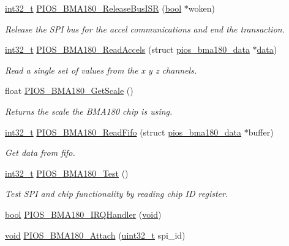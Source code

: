\begin{DoxyCompactItemize}
\hyperlink{group___n_a_m_e_gafd12020da5a235dfcf0c3c748fb5baed}{int32\-\_\-t} \hyperlink{group___p_i_o_s___b_m_a180_gac3df046a46bd9633ccb969436bb8d9ab}{P\-I\-O\-S\-\_\-\-B\-M\-A180\-\_\-\-Release\-Bus\-I\-S\-R} (\hyperlink{group___exported__types_gaf6a258d8f3ee5206d682d799316314b1}{bool} $\ast$woken)
\begin{DoxyCompactList}\small\item\em Release the S\-P\-I bus for the accel communications and end the transaction. \end{DoxyCompactList}\item 
\hyperlink{group___n_a_m_e_gafd12020da5a235dfcf0c3c748fb5baed}{int32\-\_\-t} \hyperlink{group___p_i_o_s___b_m_a180_ga7b56742fa09a8cb81b620c4ddb35e0a0}{P\-I\-O\-S\-\_\-\-B\-M\-A180\-\_\-\-Read\-Accels} (struct \hyperlink{structpios__bma180__data}{pios\-\_\-bma180\-\_\-data} $\ast$\hyperlink{pios__opahrs__proto_8h_a20e3f4bfaeccf09a75ef27e095a10112}{data})
\begin{DoxyCompactList}\small\item\em Read a single set of values from the x y z channels. \end{DoxyCompactList}\item 
float \hyperlink{group___p_i_o_s___b_m_a180_gac0b0ac69b4fecb73c72a5acf917471b4}{P\-I\-O\-S\-\_\-\-B\-M\-A180\-\_\-\-Get\-Scale} ()
\begin{DoxyCompactList}\small\item\em Returns the scale the B\-M\-A180 chip is using. \end{DoxyCompactList}\item 
\hyperlink{group___n_a_m_e_gafd12020da5a235dfcf0c3c748fb5baed}{int32\-\_\-t} \hyperlink{group___p_i_o_s___b_m_a180_gaae90c39f1345aa38815791270aca39ae}{P\-I\-O\-S\-\_\-\-B\-M\-A180\-\_\-\-Read\-Fifo} (struct \hyperlink{structpios__bma180__data}{pios\-\_\-bma180\-\_\-data} $\ast$buffer)
\begin{DoxyCompactList}\small\item\em Get data from fifo. \end{DoxyCompactList}\item 
\hyperlink{group___n_a_m_e_gafd12020da5a235dfcf0c3c748fb5baed}{int32\-\_\-t} \hyperlink{group___p_i_o_s___b_m_a180_ga581d274e0f804ba0c8ef0406a782aa8d}{P\-I\-O\-S\-\_\-\-B\-M\-A180\-\_\-\-Test} ()
\begin{DoxyCompactList}\small\item\em Test S\-P\-I and chip functionality by reading chip I\-D register. \end{DoxyCompactList}\item 
\hyperlink{group___exported__types_gaf6a258d8f3ee5206d682d799316314b1}{bool} \hyperlink{group___p_i_o_s___b_m_a180_gaded704c5b366fadaac4efb9272a9414a}{P\-I\-O\-S\-\_\-\-B\-M\-A180\-\_\-\-I\-R\-Q\-Handler} (\hyperlink{group___n_a_m_e_ga18028b8badbf1ea7e704ccac3c488e82}{void})
\item 
\hyperlink{group___n_a_m_e_ga18028b8badbf1ea7e704ccac3c488e82}{void} \hyperlink{group___p_i_o_s___b_m_a180_ga7630f96fe8305335e0f834bd7e594007}{P\-I\-O\-S\-\_\-\-B\-M\-A180\-\_\-\-Attach} (\hyperlink{stdint_8h_a435d1572bf3f880d55459d9805097f62}{uint32\-\_\-t} spi\-\_\-id)
\end{DoxyCompactItemize}
